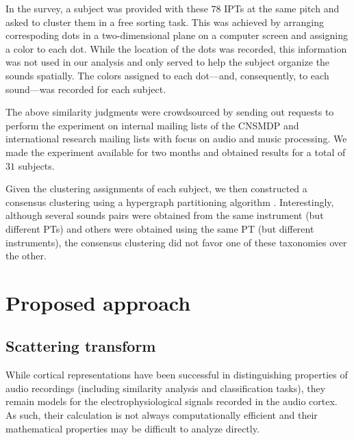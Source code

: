 \documentclass{bmcart}
\begin{document}
In the survey, a subject was provided with these $78$ IPTs at the same pitch and asked to cluster them in a free sorting task.
This was achieved by arranging correspoding dots in a two-dimensional plane on a computer screen and assigning a color to each dot.
While the location of the dots was recorded, this information was not used in our analysis and only served to help the subject organize the sounds spatially.
The colors assigned to each dot---and, consequently, to each sound---was recorded for each subject.

The above similarity judgments were crowdsourced by sending out requests to perform the experiment on internal mailing lists of the CNSMDP and international research mailing lists with focus on audio and music processing.
We made the experiment available for two months and obtained results for a total of $31$ subjects.

Given the clustering assignments of each subject, we then constructed a consensus clustering using a hypergraph partitioning algorithm \cite{kernighan1970efficient,han1997scalable,strehl2002cluster}.
Interestingly, although several sounds pairs were obtained from the same instrument (but different PTs) and others were obtained using the same PT (but different instruments), the consensus clustering did not favor one of these taxonomies over the other.

\section*{Proposed approach}
\label{sec:method}

\subsection*{Scattering transform}
\label{sec:scattering}

While cortical representations have been successful in distinguishing properties of audio recordings (including similarity analysis and classification tasks), they remain models for the electrophysiological signals recorded in the audio cortex.
As such, their calculation is not always computationally efficient and their mathematical properties may be difficult to analyze directly.
\end{document}
